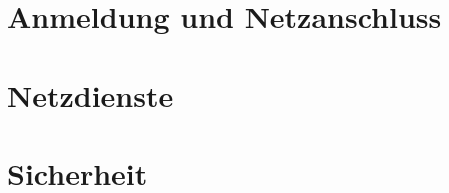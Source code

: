 \documentclass[12pt,titlepage,twoside]{scrartcl}
\newcommand{\glossar}{
\unitlength1.5mm
\begin{picture}(2,2)
\put(0,0){\vector(2,1){2.5}}
\end{picture}
}
\begin{document}
\newpage
\section{Anmeldung und Netzanschluss}


%
  




\newpage

\section{Netzdienste}




  


\newpage
\section{Sicherheit}





\end{document}
